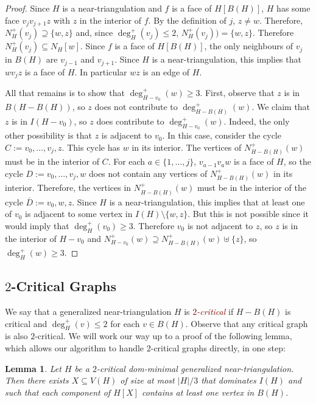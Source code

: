 \documentclass[12pt]{article}
\newtheorem{lem}{Lemma}
\newcommand{\defin}[1]{\emph{\textcolor{Maroon}{#1}}}
\theoremstyle{definition}
\begin{document}
\begin{proof}
  Since $H$ is a near-triangulation and $f$ is a face of $H[B(H)]$, $H$ has some face $v_j v_{j+1} z$ with $z$ in the interior of $f$.  By the definition of $j$, $z\neq w$.  Therefore, $N_H^+(v_j)\supseteq \{w,z\}$ and, since $\deg^+_H(v_j)\le 2$, $N_H^+(v_j))= \{w,z\}$.  Therefore $N^+_H(v_j)\subseteq N_H[w]$.  Since $f$ is a face of $H[B(H)]$, the only neighbours of $v_j$ in $B(H)$ are $v_{j-1}$ and $v_{j+1}$. Since $H$ is a near-triangulation, this implies that $w v_j z$ is a face of $H$.  In particular $wz$ is an edge of $H$.

  All that remains is to show that $\deg^+_{H-v_0}(w)\ge 3$.  First, observe that $z$ is in $B(H-B(H))$, so $z$ does not contribute to $\deg^+_{H-B(H)}(w)$. We claim that $z$ is in $I(H-v_0)$, so $z$ does contribute to $\deg^+_{H-v_0}(w)$.   Indeed, the only other possibility is that $z$ is adjacent to $v_0$.  In this case, consider the cycle $C:=v_0,\ldots,v_j,z$.  This cycle has $w$ in its interior. The vertices of $N^+_{H-B(H)}(w)$ must be in the interior of $C$. For each $a\in\{1,\ldots,j\}$, $v_{a-1}v_a w$ is a face of $H$, so the cycle $D:=v_0,\ldots,v_j,w$ does not contain any vertices of $N^+_{H-B(H)}(w)$ in its interior.  Therefore, the vertices in $N^+_{H-B(H)}(w)$ must be in the interior of the cycle $\overline{D}:=v_0,w,z$.  Since $H$ is a near-triangulation, this implies that at least one of $v_0$ is adjacent to some vertex in $I(H)\setminus\{w,z\}$. But this is not possible since it would imply that $\deg^+_H(v_0)\ge 3$.  Therefore $v_0$ is not adjacent to $z$, so $z$ is in the interior of $H-v_0$ and $N^+_{H-v_0}(w)\supseteq N^+_{H-B(H)}(w)\uplus\{z\}$, so $\deg^+_H(w)\ge 3$.
\end{proof}


\subsection{$2$-Critical Graphs}

We say that a generalized near-triangulation $H$ is \defin{$2$-critical} if $H-B(H)$ is critical and $\deg^+_H(v)\le 2$ for each $v\in B(H)$.  Observe that any critical graph is also $2$-critical.  We will work our way up to a proof of the following lemma, which allows our algorithm to handle $2$-critical graphs directly, in one step:

\begin{lem}\label{two_critical_handler}
  Let $H$ be a $2$-critical dom-minimal generalized near-triangulation.  Then there exists $X\subseteq V(H)$ of size at most $|H|/3$ that dominates $I(H)$ and such that each component of $H[X]$ contains at least one vertex in $B(H)$.
\end{lem}
\end{document}

